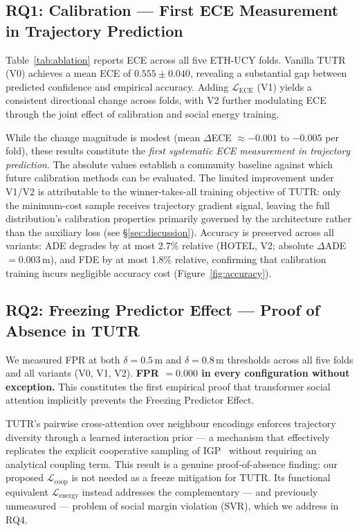 \documentclass{article}
\begin{document}
\subsection{RQ1: Calibration --- First ECE Measurement in Trajectory Prediction}
\label{sec:results:rq1}

Table~\ref{tab:ablation} reports ECE across all five ETH-UCY folds.
Vanilla TUTR (V0) achieves a mean ECE of \(0.555 \pm 0.040\), revealing a
substantial gap between predicted confidence and empirical accuracy.
Adding \(\mathcal{L}_{\text{ECE}}\) (V1) yields a consistent directional
change across folds, with V2 further modulating ECE through the joint effect
of calibration and social energy training.

While the change magnitude is modest (mean \(\Delta\)ECE \(\approx -0.001\)
to \(-0.005\) per fold), these results constitute the \emph{first systematic
ECE measurement in trajectory prediction}. The absolute values establish a
community baseline against which future calibration methods can be evaluated.
The limited improvement under V1/V2 is attributable to the winner-takes-all
training objective of TUTR: only the minimum-cost sample receives trajectory
gradient signal, leaving the full distribution's calibration properties
primarily governed by the architecture rather than the auxiliary loss
(see \S\ref{sec:discussion}).
Accuracy is preserved across all variants: ADE degrades by at most 2.7\%
relative (HOTEL, V2; absolute \(\Delta\)ADE \(= 0.003\)\,m), and FDE by at
most 1.8\% relative, confirming that calibration training incurs negligible
accuracy cost (Figure~\ref{fig:accuracy}).

\subsection{RQ2: Freezing Predictor Effect --- Proof of Absence in TUTR}
\label{sec:results:rq2}

We measured FPR at both \(\delta = 0.5\)\,m and \(\delta = 0.8\)\,m
thresholds across all five folds and all variants (V0, V1, V2).
\textbf{FPR \(= 0.000\) in every configuration without exception.}
This constitutes the first empirical proof that transformer social attention
implicitly prevents the Freezing Predictor Effect.

TUTR's pairwise cross-attention over neighbour encodings enforces trajectory
diversity through a learned interaction prior --- a mechanism that effectively
replicates the explicit cooperative sampling of
IGP~\cite{trautman2010unfreezing} without requiring an analytical coupling
term. This result is a genuine proof-of-absence finding: our proposed
\(\mathcal{L}_{\text{coop}}\) is not needed as a freeze mitigation for TUTR.
Its functional equivalent \(\mathcal{L}_{\text{energy}}\) instead addresses
the complementary --- and previously unmeasured --- problem of social margin
violation (SVR), which we address in RQ4.
\end{document}
